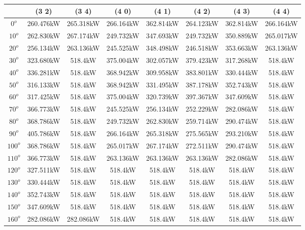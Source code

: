         \begin{table}[H]
        	\centering
        	\begin{tabular}{|c|c|c|c|c|c|c|c|} \hline
        			& (3 2)		& (3 4)		& (4 0)		& (4 1)		& (4 2)		& (4 3)		& (4 4)		\\ \hline
		$0^o$	& 260.476kW	& 265.318kW	& 266.164kW	& 362.814kW	& 264.123kW	& 362.814kW	& 266.164kW	\\ \hline
		$10^o$	& 262.830kW	& 267.174kW	& 249.732kW	& 347.693kW	& 249.732kW	& 350.889kW	& 265.017kW	\\ \hline
		$20^o$	& 256.134kW	& 263.136kW	& 245.525kW	& 348.498kW	& 246.518kW	& 353.663kW	& 263.136kW	\\ \hline
		$30^o$	& 323.680kW	& 518.4kW	& 375.004kW	& 302.057kW	& 379.423kW	& 317.268kW	& 518.4kW	\\ \hline
		$40^o$	& 336.281kW	& 518.4kW	& 368.942kW	& 309.958kW	& 383.801kW	& 330.444kW	& 518.4kW	\\ \hline
		$50^o$	& 316.133kW	& 518.4kW	& 368.942kW	& 331.495kW	& 387.178kW	& 352.743kW	& 518.4kW	\\ \hline
		$60^o$	& 317.425kW	& 518.4kW	& 375.004kW	& 320.739kW	& 397.367kW	& 347.609kW	& 518.4kW	\\ \hline
		$70^o$	& 366.773kW	& 518.4kW	& 245.525kW	& 256.134kW	& 252.229kW	& 282.086kW	& 518.4kW	\\ \hline
		$80^o$	& 368.786kW	& 518.4kW	& 249.732kW	& 262.830kW	& 259.714kW	& 290.474kW	& 518.4kW	\\ \hline
		$90^o$	& 405.786kW	& 518.4kW	& 266.164kW	& 265.318kW	& 275.565kW	& 293.210kW	& 518.4kW	\\ \hline
		$100^o$	& 368.786kW	& 518.4kW	& 265.017kW	& 267.174kW	& 272.511kW	& 290.474kW	& 518.4kW	\\ \hline
		$110^o$	& 366.773kW	& 518.4kW	& 263.136kW	& 263.136kW	& 263.136kW	& 282.086kW	& 518.4kW	\\ \hline
		$120^o$	& 327.511kW	& 518.4kW	& 518.4kW	& 518.4kW	& 518.4kW	& 518.4kW	& 518.4kW	\\ \hline
		$130^o$	& 330.444kW	& 518.4kW	& 518.4kW	& 518.4kW	& 518.4kW	& 518.4kW	& 518.4kW	\\ \hline
		$140^o$	& 352.743kW	& 518.4kW	& 518.4kW	& 518.4kW	& 518.4kW	& 518.4kW	& 518.4kW	\\ \hline
		$150^o$	& 347.609kW	& 518.4kW	& 518.4kW	& 518.4kW	& 518.4kW	& 518.4kW	& 518.4kW	\\ \hline
		$160^o$	& 282.086kW	& 282.086kW	& 518.4kW	& 518.4kW	& 518.4kW	& 518.4kW	& 518.4kW	\\ \hline

\end{tabular}
\end{table}
